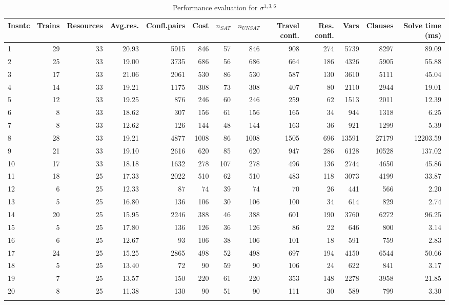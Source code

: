      \begin{landscape}
      \begin{longtable}[]{@{}lrrrrrrrrrrrr@{}}
      Insntc & Trains & Resources & Avg.res. & Confl.pairs & Cost & $n_{SAT}$ & $n_{UNSAT}$ & Travel confl. & Res. confl. & Vars & Clauses & Solve time (ms) \tabularnewline
      \midrule
      \endhead
      1&29&33&20.93&5915&846&57&846&908&274&5739&8297&89.09 \\
      2&25&33&19.00&3735&686&56&686&664&186&4326&5905&55.88 \\
      3&17&33&21.06&2061&530&86&530&587&130&3610&5111&45.04 \\
      4&14&33&19.21&1175&308&73&308&407&80&2110&2944&19.01 \\
      5&12&33&19.25&876&246&60&246&259&62&1513&2011&12.39 \\
      6&8&33&18.62&307&156&61&156&165&34&944&1318&6.25 \\
      7&8&33&12.62&126&144&48&144&163&36&921&1299&5.39 \\
      8&28&33&19.21&4877&1008&86&1008&1505&696&13591&27179&12203.59 \\
      9&21&33&19.10&2616&620&85&620&947&286&6128&10528&137.02 \\
      10&17&33&18.18&1632&278&107&278&496&136&2744&4650&45.86 \\
      11&18&25&17.33&2022&510&62&510&483&118&3073&4199&33.87 \\
      12&6&25&12.33&87&74&39&74&70&26&441&566&2.20 \\
      13&5&25&16.80&136&106&30&106&100&34&614&829&2.74 \\
      14&20&25&15.95&2246&388&46&388&601&190&3760&6272&96.25 \\
      15&5&25&17.80&136&126&36&126&86&22&646&800&3.14 \\
      16&6&25&12.67&93&106&38&106&101&18&591&759&2.83 \\
      17&24&25&15.25&2865&498&52&498&697&194&4150&6544&50.66 \\
      18&5&25&13.40&72&90&59&90&106&24&622&841&3.17 \\
      19&7&25&13.57&150&220&61&220&353&148&2278&3958&21.85 \\
      20&8&25&11.38&130&90&51&90&111&30&589&799&3.30 \\
      \caption{Performance evaluation for \Large{$\sigma^{1,3,6}$}}    
      \end{longtable}
       \end{landscape}




